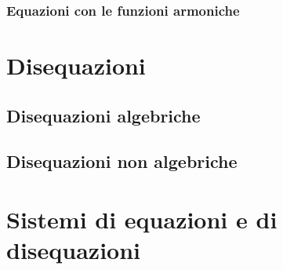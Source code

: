 \subsection{Equazioni con le funzioni armoniche}


\chapter{Disequazioni}
\section{Disequazioni algebriche}
\section{Disequazioni non algebriche}

\chapter{Sistemi di equazioni e di disequazioni}



